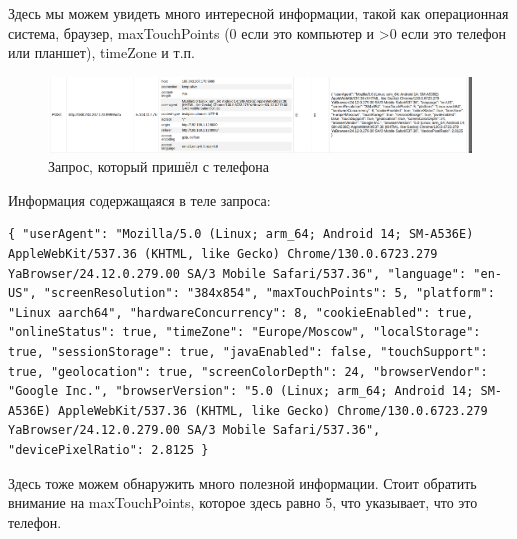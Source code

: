 \documentclass[a4paper, 12pt]{article}
\begin{document}
Здесь мы можем увидеть много интересной информации, такой как операционная система, браузер, maxTouchPoints (0 если это компьютер и >0 если это телефон или планшет), timeZone и т.п.

\newpage
\begin{figure}[h!]
    \noindent
    \centering
    \includegraphics[width=1\linewidth]{pic_phone_req.png}
    \caption{Запрос, который пришёл с телефона}
\end{figure}

Информация содержащаяся в теле запроса:
\begin{lstlisting}
{ "userAgent": "Mozilla/5.0 (Linux; arm_64; Android 14; SM-A536E) AppleWebKit/537.36 (KHTML, like Gecko) Chrome/130.0.6723.279 YaBrowser/24.12.0.279.00 SA/3 Mobile Safari/537.36", "language": "en-US", "screenResolution": "384x854", "maxTouchPoints": 5, "platform": "Linux aarch64", "hardwareConcurrency": 8, "cookieEnabled": true, "onlineStatus": true, "timeZone": "Europe/Moscow", "localStorage": true, "sessionStorage": true, "javaEnabled": false, "touchSupport": true, "geolocation": true, "screenColorDepth": 24, "browserVendor": "Google Inc.", "browserVersion": "5.0 (Linux; arm_64; Android 14; SM-A536E) AppleWebKit/537.36 (KHTML, like Gecko) Chrome/130.0.6723.279 YaBrowser/24.12.0.279.00 SA/3 Mobile Safari/537.36", "devicePixelRatio": 2.8125 }
\end{lstlisting}

Здесь тоже можем обнаружить много полезной информации. Стоит обратить внимание на maxTouchPoints, которое здесь равно 5, что указывает, что это телефон.
\end{document}
